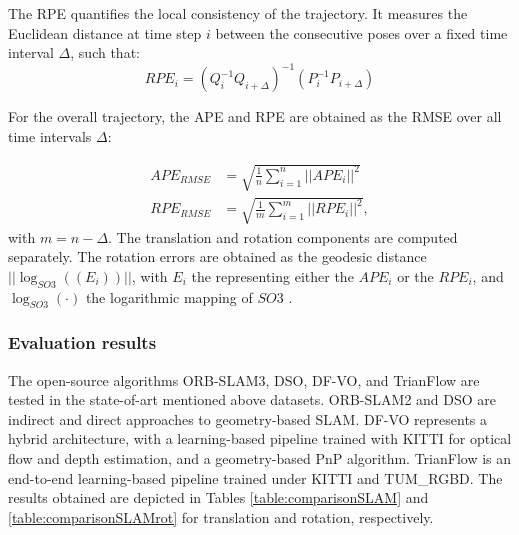 The \ac{RPE} quantifies the local consistency of the trajectory. It measures the Euclidean distance at time step $i$ between the consecutive poses over a fixed time interval $\Delta$, such  that:
\begin{equation}
    RPE_i = \left(Q_i^{-1}Q_{i+\Delta} \right)^{-1}\left(P_i^{-1}P_{i+\Delta} \right)
\end{equation}

For the overall trajectory, the \ac{APE} and \ac{RPE} are obtained as the \ac{RMSE} over all time intervals $\Delta$:

\begin{align}
   APE_{RMSE}&= \sqrt{\frac{1}{n} \sum^n_{i=1}||APE_i||^2} \\
    RPE_{RMSE} &= \sqrt{\frac{1}{m} \sum^m_{i=1}||RPE_i||^2}  ,
\end{align}
with $m = n-\Delta$. The translation and rotation components are computed separately. The rotation errors are obtained as the geodesic distance $||\log_{SO3}\left((E_i)\right)||$, with $E_i$ the representing either the $APE_i$ or the $RPE_i$, and $\log_{SO3}(\cdot)$ the logarithmic mapping of $SO3$ \cite{huynh2009metrics}.


\subsubsection{Evaluation results}
The open-source algorithms ORB-SLAM3, DSO, DF-VO,  and TrianFlow  are tested in the state-of-art mentioned above datasets. ORB-SLAM2 and DSO are indirect and direct approaches to geometry-based SLAM. DF-VO represents a hybrid architecture, with a learning-based pipeline trained with KITTI for optical flow and depth estimation, and a geometry-based PnP algorithm. TrianFlow is an end-to-end learning-based pipeline trained under KITTI and TUM\_RGBD. The results obtained are depicted in Tables \ref{table:comparisonSLAM} and \ref{table:comparisonSLAMrot} for translation and rotation, respectively.

